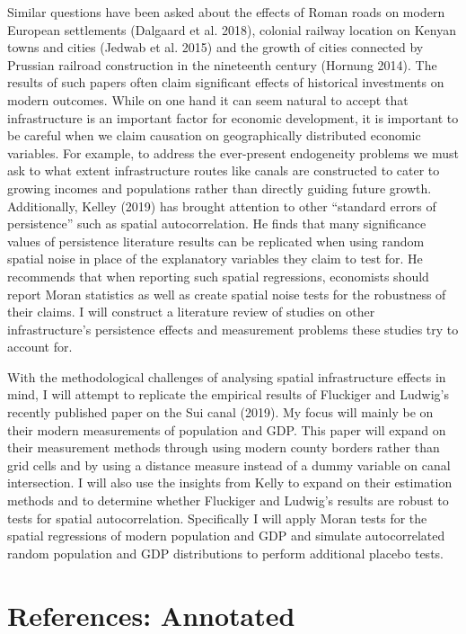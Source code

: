 \documentclass[11pt]{article}
\begin{document}
Similar questions have been asked about the effects of Roman roads on modern European settlements (Dalgaard et al. 2018), colonial railway location on Kenyan towns and cities (Jedwab et al. 2015) and the growth of cities connected by Prussian railroad construction in the nineteenth century (Hornung 2014). The results of such papers often claim significant effects of historical investments on modern outcomes. While on one hand it can seem natural to accept that infrastructure is an important factor for economic development, it is important to be careful when we claim causation on geographically distributed economic variables. For example, to address the ever-present endogeneity problems we must ask to what extent infrastructure routes like canals are constructed to cater to growing incomes and populations rather than directly guiding future growth. Additionally, Kelley (2019) has brought attention to other “standard errors of persistence” such as spatial autocorrelation. He finds that many significance values of persistence literature results can be replicated when using random spatial noise in place of the explanatory variables they claim to test for. He recommends that when reporting such spatial regressions, economists should report Moran statistics as well as create spatial noise tests for the robustness of their claims. I will construct a literature review of studies on other infrastructure’s persistence effects and measurement problems these studies try to account for.

With the methodological challenges of analysing spatial infrastructure effects in mind, I will attempt to replicate the empirical results of Fluckiger and Ludwig’s recently published paper on the Sui canal (2019). My focus will mainly be on their modern measurements of population and GDP. This paper will expand on their measurement methods through using modern county borders rather than grid cells and by using a distance measure instead of a dummy variable on canal intersection. I will also use the insights from Kelly to expand on their estimation methods and to determine whether Fluckiger and Ludwig’s results are robust to tests for spatial autocorrelation. Specifically I will apply Moran tests for the spatial regressions of modern population and GDP and simulate autocorrelated random population and GDP distributions to perform additional placebo tests.


\pagebreak

\section*{References: Annotated}
\end{document}

